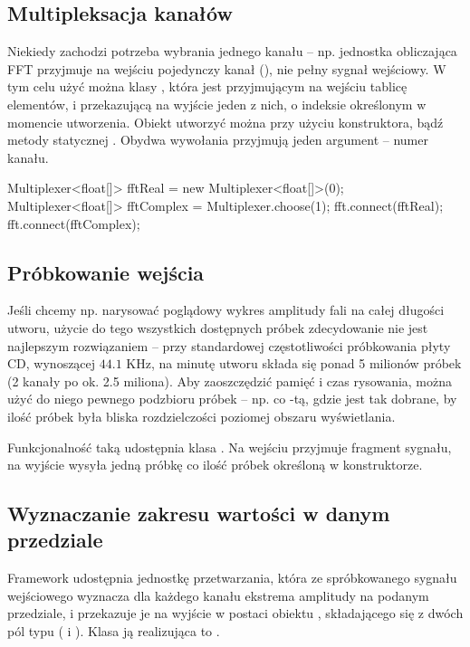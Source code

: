 \subsection{Multipleksacja kanałów}

Niekiedy zachodzi potrzeba wybrania jednego kanału -- np. jednostka obliczająca FFT przyjmuje na
wejściu pojedynczy kanał (), nie pełny sygnał wejściowy. W tym celu użyć można klasy
, która jest  przyjmującym na wejściu tablicę elementów, i
przekazującą na wyjście jeden z nich, o indeksie określonym w momencie utworzenia. Obiekt
 utworzyć można przy użyciu konstruktora, bądź metody statycznej .
Obydwa wywołania przyjmują jeden argument -- numer kanału.

\begin{java}
Multiplexer<float[]> fftReal = new Multiplexer<float[]>(0);
Multiplexer<float[]> fftComplex = Multiplexer.choose(1);
fft.connect(fftReal);
fft.connect(fftComplex);
\end{java}

\subsection{Próbkowanie wejścia}

Jeśli chcemy np. narysować poglądowy wykres amplitudy fali na całej długości utworu, użycie do tego
wszystkich dostępnych próbek zdecydowanie nie jest najlepszym rozwiązaniem -- przy standardowej
częstotliwości próbkowania płyty CD, wynoszącej $44.1$ KHz, na minutę utworu składa się ponad 5
milionów próbek (2 kanały po ok. 2.5 miliona). Aby zaoszczędzić pamięć i czas rysowania, można użyć
do niego pewnego podzbioru próbek -- np. co -tą, gdzie  jest tak dobrane, by ilość
próbek była bliska rozdzielczości poziomej obszaru wyświetlania.

Funkcjonalność taką udostępnia klasa . Na wejściu przyjmuje fragment sygnału, na
wyjście wysyła jedną próbkę co ilość próbek określoną w konstruktorze.

\subsection{Wyznaczanie zakresu wartości w danym przedziale}

Framework udostępnia jednostkę przetwarzania, która ze spróbkowanego sygnału wejściowego wyznacza
dla każdego kanału ekstrema amplitudy na podanym przedziale, i przekazuje je na wyjście w postaci
obiektu , składającego się z dwóch pól typu  ( i ).
Klasa ją realizująca to .


